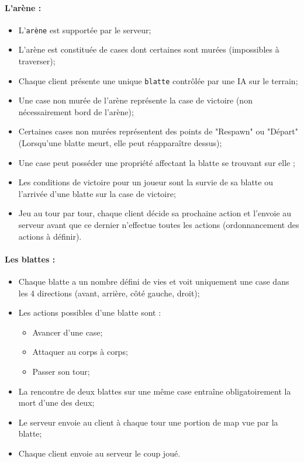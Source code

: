         \paragraph{L'arène :}
        \begin{itemize}
            \item L'\texttt{arène} est supportée par le serveur;	
            \item L'arène est constituée de cases dont certaines sont murées (impossibles à traverser);	
            \item Chaque client présente une unique \texttt{blatte} contrôlée par une IA sur le terrain;
            \item Une case non murée de l'arène représente la case de victoire (non nécessairement bord de l'arène);
            \item Certaines cases non murées représentent des points de "Respawn" ou "Départ" (Lorsqu'une blatte meurt, elle peut réapparaître dessus);
            \item Une case peut posséder une propriété affectant la blatte se trouvant sur elle ;
            \item Les conditions de victoire pour un joueur sont la survie de sa blatte ou l'arrivée d'une blatte sur la case de victoire;
            \item Jeu au tour par tour, chaque client décide sa prochaine action et l'envoie au serveur avant que ce dernier n'effectue toutes les actions (ordonnancement des actions à définir).
        \end{itemize}
        
        \paragraph{Les blattes :}
        \begin{itemize}
            \item Chaque blatte a un nombre défini de vies et voit uniquement une case dans les 4 directions (avant, arrière, côté gauche, droit);
            \item Les actions possibles d'une blatte sont :
                \begin{itemize}
                    \item Avancer d'une case;
                    \item Attaquer au corps à corps;
                    \item Passer son tour;
                \end{itemize}
            \item La rencontre de deux blattes sur une même case entraîne obligatoirement la mort d'une des deux;
            \item Le serveur envoie au client à chaque tour une portion de map vue par la blatte;
            \item Chaque client envoie au serveur le coup joué.
        \end{itemize}


